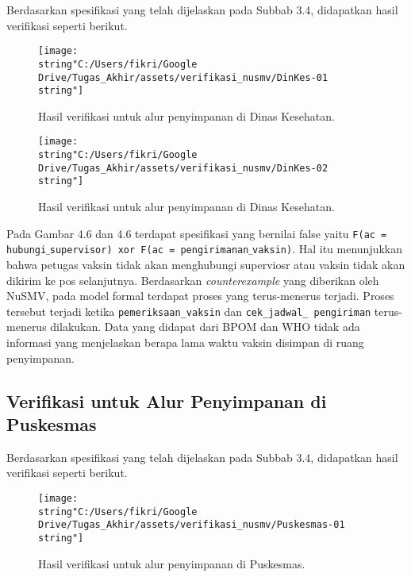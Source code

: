 Berdasarkan spesifikasi yang telah dijelaskan pada Subbab 3.4, didapatkan
hasil verifikasi seperti berikut.

\begin{figure}[H]
	\begin{centering}
		\texttt{[image: \\string"C:/Users/fikri/Google Drive/Tugas\_Akhir/assets/verifikasi\_nusmv/DinKes-01\\string"]}
		\par
	\end{centering}
	
	\caption{Hasil verifikasi untuk alur penyimpanan di Dinas Kesehatan.}
	
\end{figure}

\begin{figure}[H]
	\begin{centering}
		\texttt{[image: \\string"C:/Users/fikri/Google Drive/Tugas\_Akhir/assets/verifikasi\_nusmv/DinKes-02\\string"]}
		\par
	\end{centering}
	
	\caption{Hasil verifikasi untuk alur penyimpanan di Dinas Kesehatan.}
	
\end{figure}

Pada Gambar 4.6 dan 4.6 terdapat spesifikasi yang bernilai false yaitu \texttt{F(ac = hubungi$\_$supervisor) xor F(ac = pengirimanan$\_$vaksin)}. Hal itu menunjukkan bahwa petugas vaksin tidak akan menghubungi superviosr atau vaksin tidak akan dikirim ke pos selanjutnya. Berdasarkan \textit{counterexample} yang diberikan oleh NuSMV, pada model formal terdapat proses yang terus-menerus terjadi. Proses tersebut terjadi ketika \texttt{pemeriksaan\_vaksin} dan \texttt{cek\_jadwal\_ pengiriman} terus-menerus dilakukan. Data yang didapat dari BPOM dan WHO tidak ada informasi yang menjelaskan berapa lama waktu vaksin disimpan di ruang penyimpanan.

\subsection{Verifikasi untuk Alur Penyimpanan di Puskesmas}

Berdasarkan spesifikasi yang telah dijelaskan pada Subbab 3.4, didapatkan
hasil verifikasi seperti berikut.

\begin{figure}[H]
	\begin{centering}
		\texttt{[image: \\string"C:/Users/fikri/Google Drive/Tugas\_Akhir/assets/verifikasi\_nusmv/Puskesmas-01\\string"]}
		\par
	\end{centering}
	
	\caption{Hasil verifikasi untuk alur penyimpanan di Puskesmas.}
	
\end{figure}

